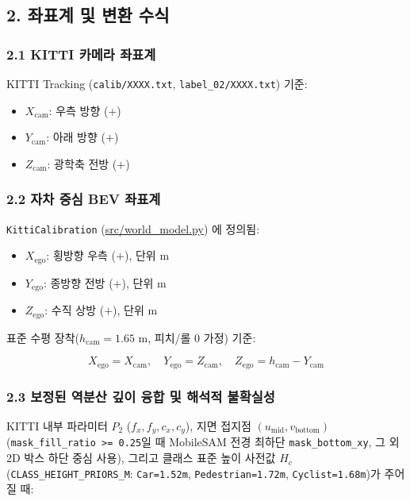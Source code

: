 \documentclass[10.5pt,a4paper]{article}
\begin{document}
\subsection{2. 좌표계 및 변환 수식}

\subsubsection{2.1 KITTI 카메라 좌표계}
KITTI Tracking (\texttt{calib/\allowbreak{}XXXX.\allowbreak{}txt}, \texttt{label\_\allowbreak{}02/\allowbreak{}XXXX.\allowbreak{}txt}) 기준:

\begin{itemize}[leftmargin=1.5em,itemsep=2pt]
\item $X_{\text{cam}}$: 우측 방향 ($+$)
\item $Y_{\text{cam}}$: 아래 방향 ($+$)
\item $Z_{\text{cam}}$: 광학축 전방 ($+$)
\end{itemize}

\subsubsection{2.2 자차 중심 BEV 좌표계}
\texttt{KittiCalibration} (\href{https://github.com/Heisnotanimposter/Totalcare\_autonomous\_driving\_Yolov5/blob/main/src/world\_model.py}{src/world\_model.py}) 에 정의됨:

\begin{itemize}[leftmargin=1.5em,itemsep=2pt]
\item $X_{\text{ego}}$: 횡방향 우측 ($+$), 단위 m
\item $Y_{\text{ego}}$: 종방향 전방 ($+$), 단위 m
\item $Z_{\text{ego}}$: 수직 상방 ($+$), 단위 m
\end{itemize}

표준 수평 장착($h_{\text{cam}} = 1.65\text{ m}$, 피치/롤 0 가정) 기준:

\[X_{\text{ego}} = X_{\text{cam}}, \quad Y_{\text{ego}} = Z_{\text{cam}}, \quad Z_{\text{ego}} = h_{\text{cam}} - Y_{\text{cam}}\]

\subsubsection{2.3 보정된 역분산 깊이 융합 및 해석적 불확실성}
KITTI 내부 파라미터 $P_2$ ($f_x, f_y, c_x, c_y$), 지면 접지점 $(u_{\text{mid}}, v_{\text{bottom}})$ (\texttt{mask\_\allowbreak{}fill\_\allowbreak{}ratio >= 0.\allowbreak{}25}일 때 MobileSAM 전경 최하단 \texttt{mask\_\allowbreak{}bottom\_\allowbreak{}xy}, 그 외 2D 박스 하단 중심 사용), 그리고 클래스 표준 높이 사전값 $H_c$ (\texttt{CLASS\_\allowbreak{}HEIGHT\_\allowbreak{}PRIORS\_\allowbreak{}M}: \texttt{Car=1.\allowbreak{}52m}, \texttt{Pedestrian=1.\allowbreak{}72m}, \texttt{Cyclist=1.\allowbreak{}68m})가 주어질 때:
\end{document}
